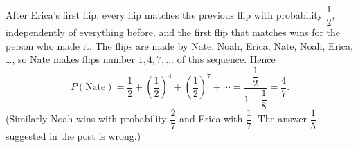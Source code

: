 After Erica's first flip, every flip matches the previous flip with probability $\dfrac{1}{2}$, independently of everything before, and the first flip that matches wins for the person who made it. The flips are made by Nate, Noah, Erica, Nate, Noah, Erica, \dots, so Nate makes flips number $1,4,7,\dots$ of this sequence. Hence
\[
P(\text{Nate})=\dfrac{1}{2}+\left(\dfrac{1}{2}\right)^4+\left(\dfrac{1}{2}\right)^7+\cdots=\dfrac{\dfrac{1}{2}}{1-\dfrac{1}{8}}=\boxed{\dfrac{4}{7}}.
\]
(Similarly Noah wins with probability $\dfrac{2}{7}$ and Erica with $\dfrac{1}{7}$. The answer $\dfrac{1}{5}$ suggested in the post is wrong.)
